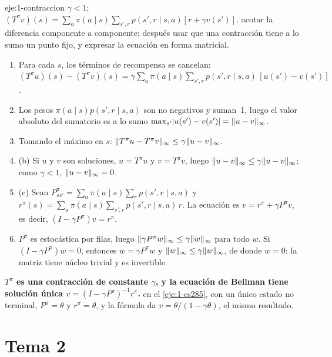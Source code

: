 \begin{solucion}{eje:1-contraccion}
\datos $\gamma<1$; $(T^{\pi}v)(s)=\sum_a\pi(a\mid s)\sum_{s',r}p(s',r\mid s,a)[r+\gamma v(s')]$.
\planteamiento acotar la diferencia componente a componente; después usar que una contracción tiene a lo sumo un punto fijo, y expresar la ecuación en forma matricial.
\pasos
\begin{enumerate}[label=\arabic*.]
  \item Para cada $s$, los términos de recompensa se cancelan: $(T^{\pi}u)(s)-(T^{\pi}v)(s)=\gamma\sum_a\pi(a\mid s)\sum_{s',r}p(s',r\mid s,a)\,[u(s')-v(s')]$.
  \item Los pesos $\pi(a\mid s)p(s',r\mid s,a)$ son no negativos y suman~1, luego el valor absoluto del sumatorio es a lo sumo $\max_{s'}\lvert u(s')-v(s')\rvert=\lVert u-v\rVert_\infty$.
  \item Tomando el máximo en $s$: $\lVert T^{\pi}u-T^{\pi}v\rVert_\infty\le\gamma\lVert u-v\rVert_\infty$.
  \item (b) Si $u$ y $v$ son soluciones, $u=T^{\pi}u$ y $v=T^{\pi}v$, luego $\lVert u-v\rVert_\infty\le\gamma\lVert u-v\rVert_\infty$; como $\gamma<1$, $\lVert u-v\rVert_\infty=0$.
  \item (c) Sean $P^{\pi}_{ss'}=\sum_a\pi(a\mid s)\sum_r p(s',r\mid s,a)$ y $r^{\pi}(s)=\sum_a\pi(a\mid s)\sum_{s',r}p(s',r\mid s,a)\,r$. La ecuación es $v=r^{\pi}+\gamma P^{\pi}v$, es decir, $(I-\gamma P^{\pi})v=r^{\pi}$.
  \item $P^{\pi}$ es estocástica por filas, luego $\lVert\gamma P^{\pi}w\rVert_\infty\le\gamma\lVert w\rVert_\infty$ para todo $w$. Si $(I-\gamma P^{\pi})w=0$, entonces $w=\gamma P^{\pi}w$ y $\lVert w\rVert_\infty\le\gamma\lVert w\rVert_\infty$, de donde $w=0$: la matriz tiene núcleo trivial y es invertible.
\end{enumerate}
\resultado \textbf{$T^{\pi}$ es una contracción de constante $\gamma$, y la ecuación de Bellman tiene solución única $v=(I-\gamma P^{\pi})^{-1}r^{\pi}$.}
\comprobacion en el \cref{eje:1-cs285}, con un único estado no terminal, $P^{\pi}=\theta$ y $r^{\pi}=\theta$, y la fórmula da $v=\theta/(1-\gamma\theta)$, el mismo resultado.
\end{solucion}

\section{Tema 2}

